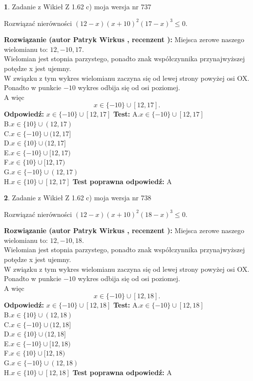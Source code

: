 \documentclass[12pt, a4paper]{article}
\theoremstyle{definition} %
\newtheorem{zad}{}
\newcommand{\zadStart}[1]{\begin{zad}#1\newline}
\newcommand{\zadStop}{\end{zad}}
\newcommand{\rozwStart}[2]{\noindent \textbf{Rozwiązanie (autor #1 , recenzent #2): }\newline}
\newcommand{\rozwStop}{\newline}
\newcommand{\odpStart}{\noindent \textbf{Odpowiedź:}\newline}
\newcommand{\odpStop}{\newline}
\newcommand{\testStart}{\noindent \textbf{Test:}\newline}
\newcommand{\testStop}{\newline}
\newcommand{\kluczStart}{\noindent \textbf{Test poprawna odpowiedź:}\newline}
\newcommand{\kluczStop}{\newline}
\begin{document}
\zadStart{Zadanie z Wikieł Z 1.62 c) moja wersja nr 737}

Rozwiązać nierówności $(12-x)(x+10)^{2}(17-x)^{3}\le0$.
\zadStop
\rozwStart{Patryk Wirkus}{}
Miejsca zerowe naszego wielomianu to: $12, -10, 17$.\\
Wielomian jest stopnia parzystego, ponadto znak współczynnika przy\linebreak najwyższej potędze x jest ujemny.\\ W związku z tym wykres wielomianu zaczyna się od lewej strony powyżej osi OX.\\
Ponadto w punkcie $-10$ wykres odbija się od osi poziomej.\\
A więc $$x \in \{-10\} \cup [12,17].$$
\rozwStop
\odpStart
$x \in \{-10\} \cup [12,17]$
\odpStop
\testStart
A.$x \in \{-10\} \cup [12,17]$\\
B.$x \in \{10\} \cup (12,17)$\\
C.$x \in \{-10\} \cup (12,17]$\\
D.$x \in \{10\} \cup (12,17]$\\
E.$x \in \{-10\} \cup [12,17)$\\
F.$x \in \{10\} \cup [12,17)$\\
G.$x \in \{-10\} \cup (12,17)$\\
H.$x \in \{10\} \cup [12,17]$
\testStop
\kluczStart
A
\kluczStop



\zadStart{Zadanie z Wikieł Z 1.62 c) moja wersja nr 738}

Rozwiązać nierówności $(12-x)(x+10)^{2}(18-x)^{3}\le0$.
\zadStop
\rozwStart{Patryk Wirkus}{}
Miejsca zerowe naszego wielomianu to: $12, -10, 18$.\\
Wielomian jest stopnia parzystego, ponadto znak współczynnika przy\linebreak najwyższej potędze x jest ujemny.\\ W związku z tym wykres wielomianu zaczyna się od lewej strony powyżej osi OX.\\
Ponadto w punkcie $-10$ wykres odbija się od osi poziomej.\\
A więc $$x \in \{-10\} \cup [12,18].$$
\rozwStop
\odpStart
$x \in \{-10\} \cup [12,18]$
\odpStop
\testStart
A.$x \in \{-10\} \cup [12,18]$\\
B.$x \in \{10\} \cup (12,18)$\\
C.$x \in \{-10\} \cup (12,18]$\\
D.$x \in \{10\} \cup (12,18]$\\
E.$x \in \{-10\} \cup [12,18)$\\
F.$x \in \{10\} \cup [12,18)$\\
G.$x \in \{-10\} \cup (12,18)$\\
H.$x \in \{10\} \cup [12,18]$
\testStop
\kluczStart
A
\kluczStop
\end{document}
